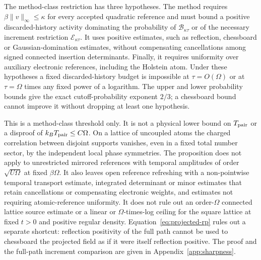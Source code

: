 \documentclass[11pt]{article}
\begin{document}
The method-class restriction has three hypotheses. The method requires $\beta\|v\|_\infty\le\kappa$ for every accepted quadratic reference and must bound a positive discarded-history activity dominating the probability of $\mathcal B_{\kappa\tau}$ or of the necessary increment restriction $\mathcal E_{\kappa\tau}$. It uses positive estimates, such as reflection, chessboard or Gaussian-domination estimates, without compensating cancellations among signed connected insertion determinants. Finally, it requires uniformity over auxiliary electronic references, including the Holstein atom. Under these hypotheses a fixed discarded-history budget is impossible at $\tau=O(\Omega)$ or at $\tau=\Omega$ times any fixed power of a logarithm. The upper and lower probability bounds give the exact cutoff-probability exponent $2/3$; a chessboard bound cannot improve it without dropping at least one hypothesis.

This is a method-class threshold only. It is not a physical lower bound on $T_{\rm pair}$ or a disproof of $k_BT_{\rm pair}\le C\Omega$. On a lattice of uncoupled atoms the charged correlation between disjoint supports vanishes, even in a fixed total number sector, by the independent local phase symmetries. The proposition does not apply to unrestricted mirrored references with temporal amplitudes of order $\sqrt{U\Omega}$ at fixed $\beta\Omega$. It also leaves open reference refreshing with a non-pointwise temporal transport estimate, integrated determinant or minor estimates that retain cancellations or compensating electronic weights, and estimates not requiring atomic-reference uniformity. It does not rule out an order-$\Omega$ connected lattice source estimate or a linear or $\Omega$-times-log ceiling for the square lattice at fixed $t>0$ and positive regular density. Equation~\eqref{eq:projected-rp} rules out a separate shortcut: reflection positivity of the full path cannot be used to chessboard the projected field as if it were itself reflection positive. The proof and the full-path increment comparison are given in Appendix~\ref{app:sharpness}.

\appendix
\end{document}
